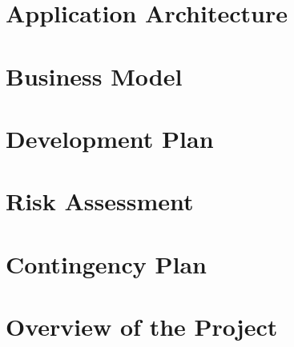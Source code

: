 \documentclass[english,runningheads,a4paper]{llncs}[2018/03/10]
\begin{document}

\section*{Application Architecture}


\section*{Business Model}


\section*{Development Plan}


\section*{Risk Assessment}


\section*{Contingency Plan}


\section*{Overview of the Project}


\printbibliography
\end{document}
